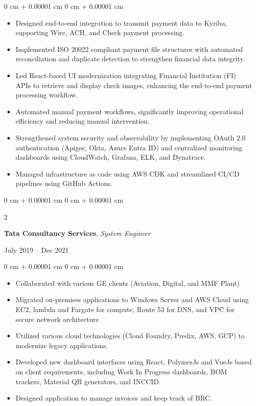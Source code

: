 \documentclass[10pt, letterpaper]{article}
\newenvironment{highlights}{
    \begin{itemize}[
        topsep=0.10 cm,
        parsep=0.10 cm,
        partopsep=0pt,
        itemsep=0pt,
        leftmargin=0 cm + 10pt
    ]
}{
    \end{itemize}
} %
\newenvironment{onecolentry}{
    \begin{adjustwidth}{
        0 cm + 0.00001 cm
    }{
        0 cm + 0.00001 cm
    }
}{
    \end{adjustwidth}
} %
\newenvironment{twocolentry}[2][]{
    \onecolentry
    \def\secondColumn{#2}
    \setcolumnwidth{\fill, 4.5 cm}
    \begin{paracol}{2}
}{
    \switchcolumn \raggedleft \secondColumn
    \end{paracol}
    \endonecolentry
} %
\begin{document}
        \vspace{0.10 cm}
        \begin{onecolentry}
            \begin{highlights}

\item Designed end-to-end integration to transmit payment data to Kyriba, supporting Wire, ACH, and Check payment processing.
\item Implemented ISO 20022 compliant payment file structures with automated reconciliation and duplicate detection to strengthen financial data integrity.
\item Led React-based UI modernization integrating Financial Institution (FI) APIs to retrieve and display check images, enhancing the end-to-end payment processing workflow.
\item Automated manual payment workflows, significantly improving operational efficiency and reducing manual intervention.
\item Strengthened system security and observability by implementing OAuth 2.0 authentication (Apigee, Okta, Azure Entra ID) and centralized monitoring dashboards using CloudWatch, Grafana, ELK, and Dynatrace.
\item Managed infrastructure as code using AWS CDK and streamlined CI/CD pipelines using GitHub Actions.
            \end{highlights}
        \end{onecolentry}
         \vspace{0.5 cm}
        \begin{twocolentry}{
            July 2019 – Dec 2021
        }
      
              \textbf{Tata Consultancy Services}, \textit{System Engineer }
             \vspace{0.10 cm}
            \end{twocolentry}

        \vspace{0.10 cm}
        \begin{onecolentry}
            \begin{highlights}
             \item Collaborated with various GE clients (Aviation, Digital, and MMF Plant)  
                           \item Migrated on-premises applications to Windows Server and AWS Cloud using EC2, lambda and Fargate for compute, Route 53 for DNS, and VPC for secure network architecture
                \item Utilized various cloud technologies (Cloud Foundry, Predix, AWS, GCP) to modernize legacy applications.
  
                \item Developed new dashboard interfaces using React, PolymerJs and VueJs based on client requirements, including Work In Progress dashboards, BOM trackers, Material QR generators, and INCCID. 
                \item Designed application to manage invoices and keep track of BRC.
            \end{highlights}
        \end{onecolentry}
\end{document}
